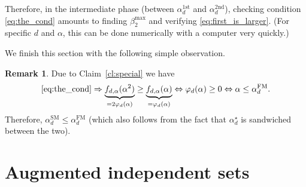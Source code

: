 \documentclass[12pt]{amsart}
\theoremstyle{definition}
\newtheorem{remark}[theorem]{Remark}
\newcommand\al{\alpha}
\newcommand\be{\beta}
\newcommand\alstar{\alpha^{\star}}
\newcommand\alfm{\alpha^{\mathrm{FM}}}
\newcommand\alsm{\alpha^{\mathrm{SM}}}
\begin{document}
Therefore, in the intermediate phase (between $\al_d^{\textrm{1st}}$ and $\al_d^{\textrm{2nd}}$), checking condition \eqref{eq:the_cond} amounts to finding $\be_2^{\max}$ and verifying \eqref{eq:first_is_larger}. (For specific $d$ and $\al$, this can be done numerically with a computer very quickly.) 

We finish this section with the following simple observation.
%
\begin{remark}
Due to Claim~\ref{cl:special} we have  
%
\[ \eqref{eq:the_cond} 
\Rightarrow 
\underbrace{f_{d,\al}(\al^2)}_{=2\varphi_d(\al)} 
\geq 
\underbrace{f_{d,\al}(\al)}_{=\varphi_d(\al)} 
\Leftrightarrow \varphi_d(\al) \geq 0 
\Leftrightarrow \al \leq \alfm_d . \]
%
Therefore, $\alsm_d \leq \alfm_d$ (which also follows from the fact that $\alstar_d$ is sandwiched between the two). 
\end{remark}
%

\section{Augmented independent sets} \label{sec:augment_indep}
\end{document}
